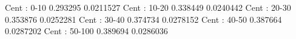Cent : 0-10
0.293295 0.0211527
Cent : 10-20
0.338449 0.0240442
Cent : 20-30
0.353876 0.0252281
Cent : 30-40
0.374734 0.0278152
Cent : 40-50
0.387664 0.0287202
Cent : 50-100
0.389694 0.0286036
